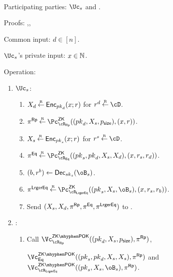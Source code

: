 \begin{protocol}~\label{prot:ConfidentialTransactions:Transfer}
	\item[Participating parties:] $\Uc_s$ and \Cc.
	
\item[Proofs:]   \piZK{\rRp},\pZK{\rEq},\pZK{\rLrgEq}



	
	\item[Common input:] $d\in [n]$.
	
	\item[$\Uc_s$'s private  input:] $x \in {\mathbb{N}}$.
	
\item[Operation:] ~
	
	\begin{enumerate}
		\item  $\Uc_s$: 
		
		\begin{enumerate}
			\item $X_d \mathbin{\stackrel{\mbox{\tiny R}}{\leftarrow}} \mathsf{Enc}_{{pk}_d}(x;r)$ for $r^d \getsr \cD$.
			
		
			\item $\pi^\RPs \getsr \pZK{\rRp}((\pk_d,X_s,\psize),(x,r))$.
			
			
			\item $X_s \mathbin{\stackrel{\mbox{\tiny R}}{\leftarrow}} \mathsf{Enc}_{{pk}_s}(x;r)$ for $r^s \getsr \cD$.
			
			
			
			\item $\pi^\Eqs \getsr \pZK{\rEq}((\pk_s,\pk_d,X_s,X_d),(x,r_s,r_d))$.
			
			
			\item $(b,r^b) \asn \Dec_{\sk_s}(\oB_s)$.
			
			
			\item $\pi^\LrgEqs \getsr \pZK{\rLrgEq}((\pk_s,X_s,\oB_s),(x,r_s,r_b))$.
			
			
			\item Send $(X_s,X_d,\pi^{\sf Rp},\pi^{\sf Eq},\pi^{\sf LrgerEq})$ to \Cc.
		\end{enumerate}
		
		
		\item  \Cc: 
		
		\begin{enumerate}
			\item  Call $\vZKPOK{\rRp}((\pk_d,X_s,\psize),\pi^\RPs)$,
			
			 $\vZKPOK{\Eqs}((\pk_s,\pk_d,X_s,X_s),\pi^\RPs)$ and $\vZKPOK{\rLrgEq}((\pk_s,X_s,\oB_s),\pi^\RPs)$.
			

\end{enumerate}
\end{enumerate}
\end{protocol}
